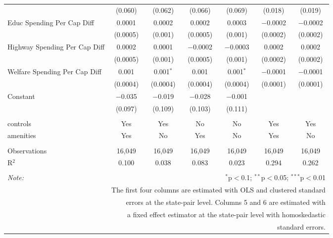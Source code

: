 \begin{table}[!htbp]
\begin{tabular}{@{\extracolsep{5pt}}lcccccc}
  & (0.060) & (0.062) & (0.066) & (0.069) & (0.018) & (0.019) \\ 
  Educ Spending Per Cap Diff & 0.0001 & 0.0002 & 0.0002 & 0.0003 & $-$0.0002 & $-$0.0002 \\ 
  & (0.0005) & (0.001) & (0.0005) & (0.001) & (0.0002) & (0.0002) \\ 
  Highway Spending Per Cap Diff & 0.0002 & 0.0001 & $-$0.0002 & $-$0.0003 & 0.0002 & 0.0002 \\ 
  & (0.0005) & (0.001) & (0.0005) & (0.001) & (0.0002) & (0.0002) \\ 
  Welfare Spending Per Cap Diff & 0.001 & 0.001$^{*}$ & 0.001 & 0.001$^{*}$ & $-$0.0001 & $-$0.0001 \\ 
  & (0.0004) & (0.0004) & (0.0004) & (0.0004) & (0.0001) & (0.0001) \\ 
  Constant & $-$0.035 & $-$0.019 & $-$0.028 & $-$0.001 &  &  \\ 
  & (0.097) & (0.109) & (0.103) & (0.111) &  &  \\ 
 \hline \\[-1.8ex] 
controls & Yes & Yes & No & No & Yes & Yes \\ 
amenities & Yes & No & Yes & No & Yes & No \\ 
\hline \\[-1.8ex] 
Observations & 16,049 & 16,049 & 16,049 & 16,049 & 16,049 & 16,049 \\ 
R$^{2}$ & 0.100 & 0.038 & 0.083 & 0.023 & 0.294 & 0.262 \\ 
\hline 
\hline \\[-1.8ex] 
\textit{Note:}  & \multicolumn{6}{r}{$^{*}$p$<$0.1; $^{**}$p$<$0.05; $^{***}$p$<$0.01} \\ 
 & \multicolumn{6}{r}{The first four columns are estimated with OLS and clustered standard} \\ 
 & \multicolumn{6}{r}{ errors at the state-pair level. Columns 5 and 6 are estimated with} \\ 
 & \multicolumn{6}{r}{a fixed effect estimator at the state-pair level with homoskedastic} \\ 
 & \multicolumn{6}{r}{standard errors.} \\ 
\end{tabular} 
\end{table} 
